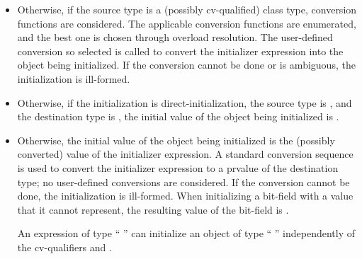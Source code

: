 \begin{itemize}
\begin{itemize}
\begin{itemize}
\begin{note}
\begin{example}
\begin{codeblock}
A a1{1, f()};                   // OK, lifetime is extended
A a2(1, f());                   // well-formed, but dangling reference
A a3{1.0, 1};                   // error: narrowing conversion
A a4(1.0, 1);                   // well-formed, but dangling reference
A a5(1.0, std::move(n));        // OK
\end{codeblock}
\end{example}
\end{note}
\item
Otherwise, the initialization is ill-formed.
\end{itemize}

\item
Otherwise (i.e., for the remaining copy-initialization cases),
user-defined conversions that can convert from the
source type to the destination type or (when a conversion function
is used) to a derived class thereof are enumerated as described in~\ref{over.match.copy},
and the best one is chosen through overload resolution.
If the conversion cannot be done or
is ambiguous, the initialization is ill-formed.  The function
selected is called with the initializer expression as its
argument; if the function is a constructor, the call is a prvalue
of the cv-unqualified version of the
destination type whose result object is initialized by the constructor.
The call is used
to direct-initialize, according to the rules above, the object
that is the destination of the copy-initialization.
\end{itemize}

\item
Otherwise, if the source type
is a (possibly cv-qualified) class type, conversion functions are
considered.
The applicable conversion functions are enumerated,
and the best one is chosen through overload
resolution.
The user-defined conversion so selected
is called to convert the initializer expression into the
object being initialized.
If the conversion cannot be done or is
ambiguous, the initialization is ill-formed.
\item
Otherwise, if the initialization is direct-initialization,
the source type is , and
the destination type is ,
the initial value of the object being initialized is .
\item
Otherwise, the initial value of the object being initialized is
the (possibly converted) value of the initializer expression.
A standard conversion sequence is used
to convert the initializer expression to
a prvalue of
the destination type;
no user-defined conversions are considered.
If the conversion cannot
be done, the initialization is ill-formed.
When initializing a bit-field with a value that it cannot represent, the
resulting value of the bit-field is
.
%
\begin{note}
An expression of type
`` ''
can initialize an object of type
`` ''
independently of
the cv-qualifiers
and .


\end{note}
\end{itemize}
